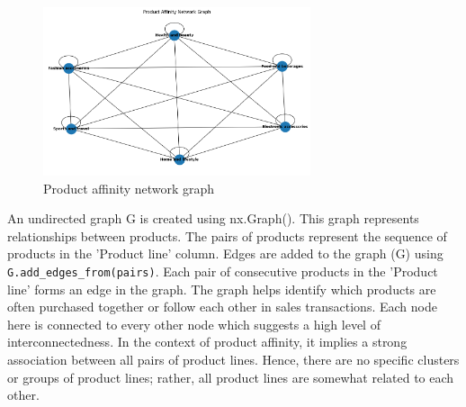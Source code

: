 \begin{figure}[h]
    \centering
    \includegraphics[width=0.7\textwidth]{Chapters/ch3/ch_3_graph.png}
    \caption{Product affinity network graph}
\end{figure}
\newpage
An undirected graph G is created using nx.Graph(). This graph represents relationships between products. The pairs of products represent the sequence of products in the 'Product line' column. Edges are added to the graph (G) using \verb|G.add_edges_from(pairs)|. Each pair of consecutive products in the 'Product line' forms an edge in the graph. The graph helps identify which products are often purchased together or follow each other in sales transactions. Each node here is connected to every other node which suggests a high level of interconnectedness. In the context of product affinity, it implies a strong association between all pairs of product lines. Hence, there are no specific clusters or groups of product lines; rather, all product lines are somewhat related to each other.



